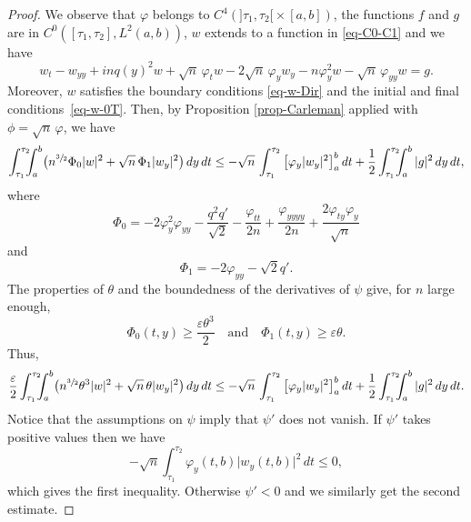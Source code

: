 \documentclass[10pt]{amsart}
\theoremstyle{plain}
\theoremstyle{definition}
\newcommand{\abs}[1]{\vert #1\vert}
\newcommand{\1}{\mathds 1}
\let\e\varepsilon
\let\th\theta
\let\f\varphi
\let\vf\phi
\begin{document}
\begin{proof}
We observe that $\varphi$ belongs to $C^4(]\tau_1,\tau_2[{}\times [a,b])$, the functions $f$ and $g$ are in $C^0([\tau_1,\tau_2], L^2(a,b))$, $w$ extends to a function in \eqref{eq-C0-C1} and we have
\begin{equation*}
w_t - w_{yy} + inq(y)^2 w + \sqrt n\,\f_t w - 2 \sqrt n\,\f_y w_y - n \f_y^2 w - \sqrt n\,\f_{yy} w = g.
\end{equation*}
Moreover, $w$ satisfies the boundary conditions \eqref{eq-w-Dir} and the initial and final conditions~\eqref{eq-w-0T}. Then, by Proposition \ref{prop-Carleman} applied with $\vf = \sqrt n\,\f$, we have
\[
\int_{\tau_1}^{\tau_2}\hspace*{-2mm} \int_a^b \bigl(n^{\sfrac 32} \Phi_0 \abs w^2 + \sqrt n\,\Phi_1 \abs{w_y}^2 \bigr) \, dy \, dt
\leq - \sqrt n\,\int_{\tau_1}^{\tau_2} \big[ \f_y \abs{w_y}^2 \big]_a^b \, dt + \frac 1 2 \int_{\tau_1}^{\tau_2}\hspace*{-2mm} \int_a^b \abs{g}^2 \, dy \, dt ,
\]
where
\begin{equation*}
\Phi_0 = - 2 \f_y^2 \f_{yy} - \frac {q^2 q'}{\sqrt 2} - \frac {\f_{tt}}{2n} + \frac {\f_{yyyy}}{2n} + \frac {2\f_{ty} \f_{y}}{\sqrt n}
\end{equation*}
and
\begin{equation*}
\Phi_1 = - 2 \f_{yy} - \sqrt 2 q'.
\end{equation*}
The properties of $\th$ and the boundedness of the derivatives of $\psi$ give, for $n$ large enough,
\[
\Phi_0(t,y) \geq \frac {\e \th^3} 2 \quad \text{and} \quad \Phi_1(t,y) \geq \e \th.
\]
Thus,
\[
\frac \e 2 \int_{\tau_1}^{\tau_2}\hspace*{-2mm} \int_a^b \bigl(n^{\sfrac 32} \th^3 \abs w^2 + \sqrt n\,\th \abs{w_y}^2 \bigr) \, dy \, dt
\leq - \sqrt n\,\int_{\tau_1}^{\tau_2} \big[ \f_y \abs{w_y}^2 \big]_a^b \, dt + \frac 12 \int_{\tau_1}^{\tau_2}\hspace*{-2mm} \int_a^b \abs g^2 \, dy \, dt.
\]
Notice that the assumptions on $\psi$ imply that $\psi'$ does not vanish. If $\psi'$ takes positive values then we have
\[
- \sqrt n \int_{\tau_1}^{\tau_2} \f_y(t,b) \abs{w_y(t,b)}^2 \, dt \leq 0,
\]
which gives the first inequality. Otherwise $\psi' < 0$ and we similarly get the second estimate.
\end{proof}

 \label{sec-observability-fin}
\end{document}
